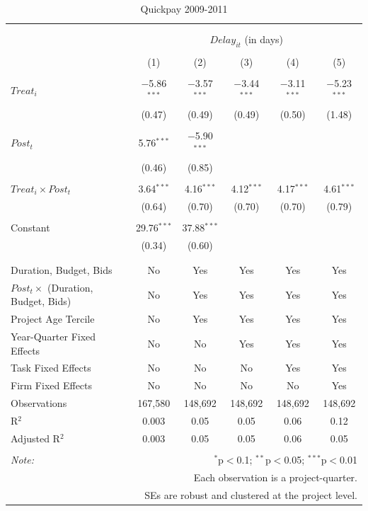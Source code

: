 \documentclass[
]{article}
\begin{document}
\begin{table}[H] \centering 
  \caption{Quickpay 2009-2011} 
  \label{} 
\small 
\begin{tabular}{@{\extracolsep{-2pt}}lccccc} 
\\[-1.8ex]\hline 
\hline \\[-1.8ex] 
\\[-1.8ex] & \multicolumn{5}{c}{$Delay_{it}$ (in days)} \\ 
\\[-1.8ex] & (1) & (2) & (3) & (4) & (5)\\ 
\hline \\[-1.8ex] 
 $Treat_i$ & $-$5.86$^{***}$ & $-$3.57$^{***}$ & $-$3.44$^{***}$ & $-$3.11$^{***}$ & $-$5.23$^{***}$ \\ 
  & (0.47) & (0.49) & (0.49) & (0.50) & (1.48) \\ 
  & & & & & \\ 
 $Post_t$ & 5.76$^{***}$ & $-$5.90$^{***}$ &  &  &  \\ 
  & (0.46) & (0.85) &  &  &  \\ 
  & & & & & \\ 
 $Treat_i \times Post_t$ & 3.64$^{***}$ & 4.16$^{***}$ & 4.12$^{***}$ & 4.17$^{***}$ & 4.61$^{***}$ \\ 
  & (0.64) & (0.70) & (0.70) & (0.70) & (0.79) \\ 
  & & & & & \\ 
 Constant & 29.76$^{***}$ & 37.88$^{***}$ &  &  &  \\ 
  & (0.34) & (0.60) &  &  &  \\ 
  & & & & & \\ 
\hline \\[-1.8ex] 
Duration, Budget, Bids & No & Yes & Yes & Yes & Yes \\ 
$Post_t \times$  (Duration, Budget, Bids) & No & Yes & Yes & Yes & Yes \\ 
Project Age Tercile & No & Yes & Yes & Yes & Yes \\ 
Year-Quarter Fixed Effects & No & No & Yes & Yes & Yes \\ 
Task Fixed Effects & No & No & No & Yes & Yes \\ 
Firm Fixed Effects & No & No & No & No & Yes \\ 
Observations & 167,580 & 148,692 & 148,692 & 148,692 & 148,692 \\ 
R$^{2}$ & 0.003 & 0.05 & 0.05 & 0.06 & 0.12 \\ 
Adjusted R$^{2}$ & 0.003 & 0.05 & 0.05 & 0.06 & 0.05 \\ 
\hline 
\hline \\[-1.8ex] 
\textit{Note:}  & \multicolumn{5}{r}{$^{*}$p$<$0.1; $^{**}$p$<$0.05; $^{***}$p$<$0.01} \\ 
 & \multicolumn{5}{r}{Each observation is a project-quarter.} \\ 
 & \multicolumn{5}{r}{SEs are robust and clustered at the project level.} \\ 
\end{tabular} 
\end{table}
\end{document}
